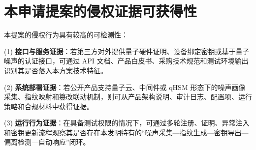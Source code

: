 \documentclass[12pt,a4paper]{article}
\begin{document}
\section{本申请提案的侵权证据可获得性}

本提案的侵权行为具有较高的可检测性：

(1) \textbf{接口与服务证据}：若第三方对外提供量子硬件证明、设备绑定密钥或基于量子噪声的认证接口，可通过 API 文档、产品白皮书、采购技术规范和测试环境输出识别其是否落入本方案技术特征。

(2) \textbf{系统部署证据}：若公开产品支持量子云、中间件或 qHSM 形态下的噪声画像采集、指纹映射和篡改联动机制，则可从产品架构说明、审计日志、配置项、运行策略和合规材料中获得证据。

(3) \textbf{运行行为证据}：在具备测试权限的情况下，可通过多轮注册、证明、异常注入和密钥更新流程观察其是否存在本发明特有的“噪声采集—指纹生成—密钥导出—偏离检测—自动响应”闭环。
\end{document}
